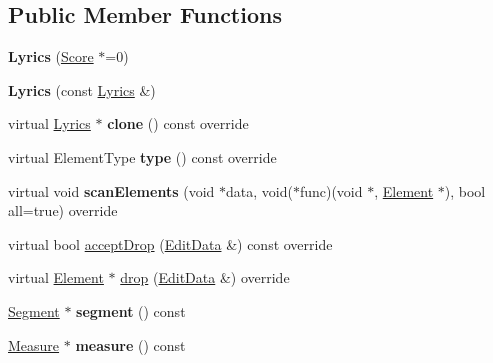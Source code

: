 \subsection*{Public Member Functions}
\begin{DoxyCompactItemize}
\item 
\mbox{\label{class_ms_1_1_lyrics_aa10bb44660d30084287115e76bed9c92}} 
{\bfseries Lyrics} (\hyperlink{class_ms_1_1_score}{Score} $\ast$=0)
\item 
\mbox{\label{class_ms_1_1_lyrics_a273e41f38bfc66ea4982c11687af3061}} 
{\bfseries Lyrics} (const \hyperlink{class_ms_1_1_lyrics}{Lyrics} \&)
\item 
\mbox{\label{class_ms_1_1_lyrics_a9542274b461f374001e7554c6268561c}} 
virtual \hyperlink{class_ms_1_1_lyrics}{Lyrics} $\ast$ {\bfseries clone} () const override
\item 
\mbox{\label{class_ms_1_1_lyrics_afc05368ab443225c0dd777bbad351ccf}} 
virtual Element\+Type {\bfseries type} () const override
\item 
\mbox{\label{class_ms_1_1_lyrics_abbacb411cc214f66088c52e73bcb6e60}} 
virtual void {\bfseries scan\+Elements} (void $\ast$data, void($\ast$func)(void $\ast$, \hyperlink{class_ms_1_1_element}{Element} $\ast$), bool all=true) override
\item 
virtual bool \hyperlink{class_ms_1_1_lyrics_ac43270be909641564ad6ded9af47cafa}{accept\+Drop} (\hyperlink{class_ms_1_1_edit_data}{Edit\+Data} \&) const override
\item 
virtual \hyperlink{class_ms_1_1_element}{Element} $\ast$ \hyperlink{class_ms_1_1_lyrics_acbb976663d84ab3abf82d0609574b26f}{drop} (\hyperlink{class_ms_1_1_edit_data}{Edit\+Data} \&) override
\item 
\mbox{\label{class_ms_1_1_lyrics_ae6e1af917b0ea219df0692f68670f497}} 
\hyperlink{class_ms_1_1_segment}{Segment} $\ast$ {\bfseries segment} () const
\item 
\mbox{\label{class_ms_1_1_lyrics_ad51a998cd270c92452def9fb1061a87f}} 
\hyperlink{class_ms_1_1_measure}{Measure} $\ast$ {\bfseries measure} () const

\end{DoxyCompactItemize}
